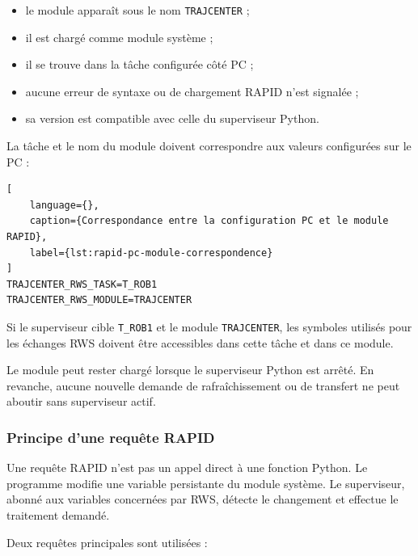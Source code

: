 \documentclass{rapportENSAM}
\begin{document}
\begin{itemize}
    \item le module apparaît sous le nom \texttt{TRAJCENTER} ;
    \item il est chargé comme module système ;
    \item il se trouve dans la tâche configurée côté PC ;
    \item aucune erreur de syntaxe ou de chargement RAPID n'est signalée ;
    \item sa version est compatible avec celle du superviseur Python.
\end{itemize}

La tâche et le nom du module doivent correspondre aux valeurs configurées sur
le PC :

\begin{lstlisting}[
    language={},
    caption={Correspondance entre la configuration PC et le module RAPID},
    label={lst:rapid-pc-module-correspondence}
]
TRAJCENTER_RWS_TASK=T_ROB1
TRAJCENTER_RWS_MODULE=TRAJCENTER
\end{lstlisting}

Si le superviseur cible \texttt{T\_ROB1} et le module
\texttt{TRAJCENTER}, les symboles utilisés pour les échanges RWS doivent être
accessibles dans cette tâche et dans ce module.

Le module peut rester chargé lorsque le superviseur Python est arrêté. En
revanche, aucune nouvelle demande de rafraîchissement ou de transfert ne peut
aboutir sans superviseur actif.


\subsubsection{Principe d'une requête RAPID}
\label{subsubsec:rapid-request-principle}

Une requête RAPID n'est pas un appel direct à une fonction Python. Le programme
modifie une variable persistante du module système. Le superviseur, abonné aux
variables concernées par RWS, détecte le changement et effectue le traitement
demandé.

Deux requêtes principales sont utilisées :
\end{document}
